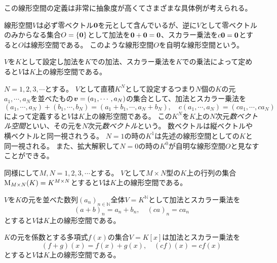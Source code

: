 この線形空間の定義は非常に抽象度が高くてさまざまな具体例が考えられる。

\begin{example}[自明な線形空間]
線形空間$V$は必ず零ベクトル$\vb*{0}$を元として含んでいるが、逆に$V$として零ベクトルのみからなる集合$O = \{ \vb*{0} \}$として加法を$\vb*{0}+\vb*{0} = \vb*{0}$、スカラー乗法を$c\vb*{0} = \vb*{0}$とすると$O$は線形空間である。
このような線形空間$O$を自明な線形空間という。
\end{example}

\begin{example}[スカラーの空間]
$V$を$K$として設定し加法を$K$での加法、スカラー乗法を$K$での乗法によって定めると$V$は$K$上の線形空間である。
\end{example}

\begin{example}[数ベクトル空間]
$N = 1, 2, 3, \cdots$とする。
$V$として直積$K^N$として設定するつまり$N$個の$K$の元$a_1, \cdots, a_N$を並べたもの$\vb*{v} = (a_1, \cdots, a_N)$の集合として、加法とスカラー乗法を
$$
(a_1, \cdots, a_N)+(b_1, \cdots, b_N) = (a_1+b_1, \cdots, a_N+b_N),
\quad c(a_1, \cdots, a_N) = (c a_1, \cdots, c a_N)
$$
によって定義すると$V$は$K$上の線形空間である。
この$K^N$を$K$上の$N$次元\emph{数ベクトル空間}といい、その元を$N$次元\emph{数ベクトル}という。
数ベクトルは縦ベクトルや横ベクトルと同一視されうる。
$N = 1$の時の$K^1$は先述の線形空間としての$K$と同一視される。
また、拡大解釈して$N = 0$の時の$K^0$が自明な線形空間$O$と見なすことができる。
\end{example}

\begin{example}[行列空間]
同様にして$M, N = 1, 2, 3, \cdots$とする。
$V$として$M\times N$型の$K$上の行列の集合$\mathrm{M}_{M\times N}(K) = K^{M\times N}$とすると$V$は$K$上の線形空間である。
\end{example}

\begin{example}[数列空間]
$V$を$K$の元を並べた数列$(a_n)_{n \in \mathbb{N}}$全体$V = K^\mathbb{N}$として加法とスカラー乗法を
$$
(a+b)_n = a_n+b_n,
\quad (c a)_n = c a_n
$$
とすると$V$は$K$上の線形空間である。
\end{example}

\begin{example}[多項式空間]
$K$の元を係数とする多項式$f(x)$の集合$V = K[x]$は加法とスカラー乗法を
$$
(f+g)(x) = f(x)+g(x),
\quad (c f)(x) = c f(x)
$$
とすると$V$は$K$上の線形空間である。
\end{example}

